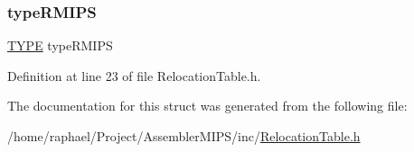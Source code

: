 \subsubsection{\texorpdfstring{type\+R\+M\+I\+PS}{typeRMIPS}}
{\footnotesize\ttfamily \mbox{\hyperlink{_relocation_table_8h_a0bc6723d5d4776ab7cdc646728b775f7}{T\+Y\+PE}} type\+R\+M\+I\+PS}



Definition at line 23 of file Relocation\+Table.\+h.



The documentation for this struct was generated from the following file\+:\begin{DoxyCompactItemize}
\item 
/home/raphael/\+Project/\+Assembler\+M\+I\+P\+S/inc/\mbox{\hyperlink{_relocation_table_8h}{Relocation\+Table.\+h}}\end{DoxyCompactItemize}
